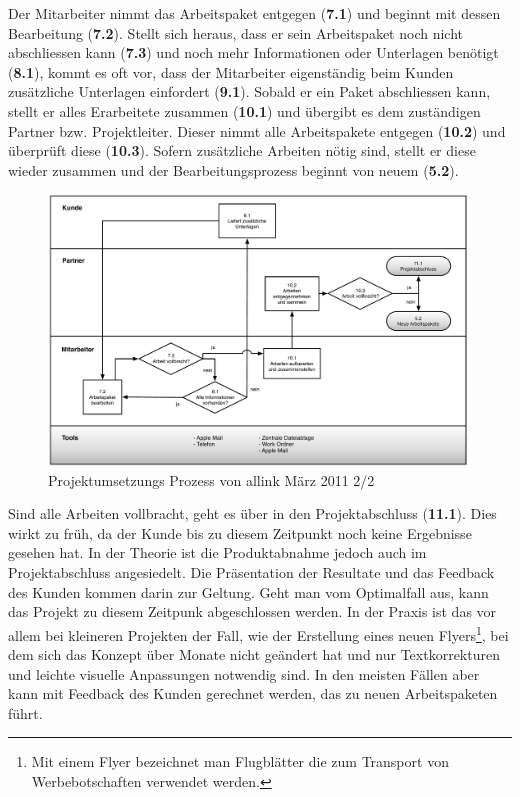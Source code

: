 Der Mitarbeiter nimmt das Arbeitspaket entgegen (\textbf{7.1}) und beginnt
mit dessen Bearbeitung (\textbf{7.2}). Stellt sich heraus, dass er sein Arbeitspaket
noch nicht abschliessen kann (\textbf{7.3}) und noch mehr Informationen oder
Unterlagen benötigt (\textbf{8.1}), kommt es oft vor, dass der Mitarbeiter
eigenständig beim Kunden zusätzliche Unterlagen einfordert (\textbf{9.1}).
Sobald er ein Paket abschliessen kann, stellt er alles Erarbeitete zusammen (\textbf{10.1})
und übergibt es dem zuständigen Partner bzw. Projektleiter.
Dieser nimmt alle Arbeitspakete entgegen (\textbf{10.2})
und überprüft diese (\textbf{10.3}). Sofern zusätzliche Arbeiten nötig sind,
stellt er diese wieder zusammen und der Bearbeitungsprozess beginnt von neuem (\textbf{5.2}).

\begin{figure}[htbp]
\begin{center}
\includegraphics[width=0.99\textwidth,angle=0]{./bilder/analyse/02_ist_prozesse_arbeit_02.pdf}
\caption{Projektumsetzungs Prozess von allink März 2011 2/2}
\label{pic:02_ist_prozesse_arbeit_02}
\end{center}
\end{figure}

Sind alle Arbeiten vollbracht, geht es über in den Projektabschluss (\textbf{11.1}). Dies wirkt
zu früh, da der Kunde bis zu diesem Zeitpunkt noch keine Ergebnisse gesehen
hat. In der Theorie ist die Produktabnahme jedoch auch im Projektabschluss angesiedelt.
Die Präsentation der Resultate und das Feedback des Kunden kommen darin zur Geltung. 
Geht man vom Optimalfall aus, kann das Projekt zu diesem Zeitpunk abgeschlossen 
werden. In der Praxis ist das vor allem bei kleineren Projekten der Fall, wie 
der Erstellung eines neuen Flyers\footnote{Mit einem Flyer bezeichnet man Flugblätter
die zum Transport von Werbebotschaften verwendet werden.}, bei dem sich das Konzept 
über Monate nicht geändert hat und nur Textkorrekturen und leichte visuelle 
Anpassungen notwendig sind. In den meisten Fällen aber kann mit Feedback des
Kunden gerechnet werden, das zu neuen Arbeitspaketen führt.

